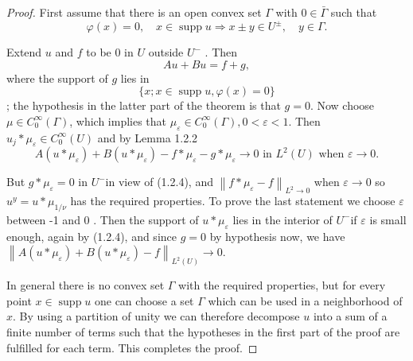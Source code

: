 \documentclass[lang=cn,zihao=-4,a4paper,fontset=none]{beautybook}
\begin{document}
\begin{proof}
 First assume that there is an open convex set $\Gamma$ with $0 \in \bar{\Gamma}$ such that
$$
\varphi(x)=0, \quad x \in \operatorname{supp} u \Rightarrow x \pm y \in U ^\pm, \quad y \in \Gamma .
$$

Extend $u$ and $f$ to be 0 in $U$ outside $U^-$ . Then
$$
A u+B u=f+g,
$$
where the support of $g$ lies in $$\{x ; x \in \operatorname{supp} u, \varphi(x)=0\}$$; the hypothesis in the latter part of the theorem is that $g=0$. Now choose $\mu \in C_0^{\infty}(\Gamma)$, which implies that $\mu_{\varepsilon} \in C_0^{\infty}(\Gamma), 0<\varepsilon<1$. Then $u_j * \mu_{\varepsilon} \in C_0^{\infty}(U)$ and by Lemma 1.2.2
$$
A\left(u * \mu_{\varepsilon}\right)+B\left(u * \mu_{\varepsilon}\right)-f * \mu_{\varepsilon}-g * \mu_{\varepsilon} \rightarrow 0 \text { in } L^2(U) \text { when } \varepsilon \rightarrow 0 .
$$

But $g * \mu_{\varepsilon}=0$ in $U^{-}$in view of (1.2.4), and $\left\|f * \mu_{\varepsilon}-f\right\|_{L^2 \rightarrow 0}$ when $\varepsilon \rightarrow 0$ so $u^y=u * \mu_{1 / \nu}$ has the required properties. To prove the last statement we choose $\varepsilon$ between -1 and 0 . Then the support of $u * \mu_{\varepsilon}$ lies in the interior of $U^{-}$if $\varepsilon$ is small enough, again by (1.2.4), and since $g=0$ by hypothesis now, we have $\left\|A\left(u * \mu_{\varepsilon}\right)+B\left(u * \mu_{\varepsilon}\right)-f\right\|_{L^2(U)} \rightarrow 0$.

In general there is no convex set $\Gamma$ with the required properties, but for every point $x \in \operatorname{supp} u$ one can choose a set $\Gamma$ which can be used in a neighborhood of $x$. By using a partition of unity we can therefore decompose $u$ into a sum of a finite number of terms such that the hypotheses in the first part of the proof are fulfilled for each term. This completes the proof.
\end{proof}
\end{document}
